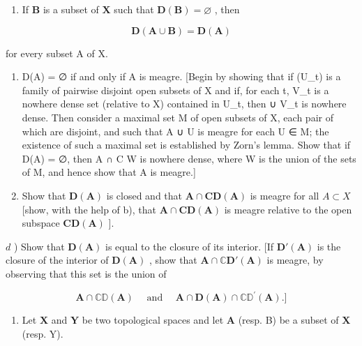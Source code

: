 \begin{enumerate}
\def\labelenumi{\alph{enumi})}
\tightlist
\item
  If \(\mathbf{B}\) is a subset of \(\mathbf{X}\) such that \(\mathbf{D}(\mathbf{B}) = \varnothing\) , then
\end{enumerate}

\[
\mathbf {D} (\mathbf {A} \cup \mathbf {B}) = \mathbf {D} (\mathbf {A})
\]

for every subset A of X.

\begin{enumerate}
\def\labelenumi{\alph{enumi})}
\setcounter{enumi}{1}
\item
  D(A) = ∅ if and only if A is meagre. {[}Begin by showing that if (U\_t) is a family of pairwise disjoint open subsets of X and if, for each t, V\_t is a nowhere dense set (relative to X) contained in U\_t, then ∪ V\_t is nowhere dense. Then consider a maximal set M of open subsets of X, each pair of which are disjoint, and such that A ∪ U is meagre for each U ∈ M; the existence of such a maximal set is established by Zorn's lemma. Show that if D(A) = ∅, then A ∩ C W is nowhere dense, where W is the union of the sets of M, and hence show that A is meagre.{]}
\item
  Show that \(\mathbf{D}(\mathbf{A})\) is closed and that \(\mathbf{A} \cap \mathbf{CD}(\mathbf{A})\) is meagre for all \(A \subset X\) {[}show, with the help of b), that \(\mathbf{A} \cap \mathbf{CD}(\mathbf{A})\) is meagre relative to the open subspace \(\mathbf{CD}(\mathbf{A})\) {]}.
\end{enumerate}

\(d\) ) Show that \(\mathbf{D}(\mathbf{A})\) is equal to the closure of its interior. {[}If \(\mathbf{D}'(\mathbf{A})\) is the closure of the interior of \(\mathbf{D}(\mathbf{A})\) , show that \(\mathbf{A} \cap \mathbb{C}\mathbf{D}'(\mathbf{A})\) is meagre, by observing that this set is the union of

\[
\mathbf {A} \cap \mathbb {C D} (\mathbf {A}) \quad \text { and } \quad \mathbf {A} \cap \mathbf {D} (\mathbf {A}) \cap \mathbb {C D} ^ {\prime} (\mathbf {A}). ]
\]

\begin{enumerate}
\def\labelenumi{\arabic{enumi})}
\setcounter{enumi}{3}
\tightlist
\item
  Let \(\mathbf{X}\) and \(\mathbf{Y}\) be two topological spaces and let \(\mathbf{A}\) (resp. B) be a subset of \(\mathbf{X}\) (resp. Y).
\end{enumerate}

